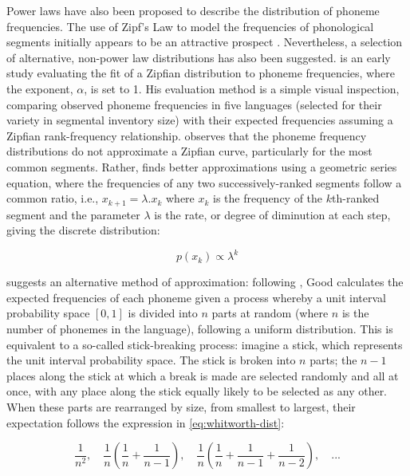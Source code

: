 Power laws have also been proposed to describe the distribution of phoneme frequencies. The use of Zipf's Law to model the frequencies of phonological segments initially appears to be an attractive prospect \autocite[pp.~565--566]{witten_source_1990}. Nevertheless, a selection of alternative, non-power law distributions has also been suggested. \textcite{sigurd_rank-frequency_1968} is an early study evaluating the fit of a Zipfian distribution to phoneme frequencies, where the exponent, \(\alpha\), is set to 1. His evaluation method is a simple visual inspection, comparing observed phoneme frequencies in five languages (selected for their variety in segmental inventory size) with their expected frequencies assuming a Zipfian rank-frequency relationship. \textcite[p.~8]{sigurd_rank-frequency_1968} observes that the phoneme frequency distributions do not approximate a Zipfian curve, particularly for the most common segments. Rather, \textcite{sigurd_rank-frequency_1968} finds better approximations using a geometric series equation, where the frequencies of any two successively-ranked segments follow a common ratio, i.e., \(x_{k+1} = \lambda.x_k\) where \(x_k\) is the frequency of the \(k\)th-ranked segment and the parameter \(\lambda\) is the rate, or degree of diminution at each step, giving the discrete distribution:

\begin{equation}
p(x_k) \propto \lambda^k
\label{eq:sigurds-geometric}
\end{equation}

\textcite[p.577]{good_statistics_1969} suggests an alternative method of approximation: following \textcite{whitworth_choice_1901}, Good calculates the expected frequencies of each phoneme given a process whereby a unit interval probability space \([0,1]\) is divided into \(n\) parts at random (where \(n\) is the number of phonemes in the language), following a uniform distribution. This is equivalent to a so-called stick-breaking process: imagine a stick, which represents the unit interval probability space. The stick is broken into \(n\) parts; the \(n-1\) places along the stick at which a break is made are selected randomly and all at once, with any place along the stick equally likely to be selected as any other. When these parts are rearranged by size, from smallest to largest, their expectation follows the expression in \eqref{eq:whitworth-dist}:

\begin{equation}
\frac{1}{n^2},\quad \frac{1}{n} \left( \frac{1}{n} + \frac{1}{n-1} \right),\quad \frac{1}{n} \left( \frac{1}{n} + \frac{1}{n-1} + \frac{1}{n-2} \right),\quad ...
\label{eq:whitworth-dist}
\end{equation}

